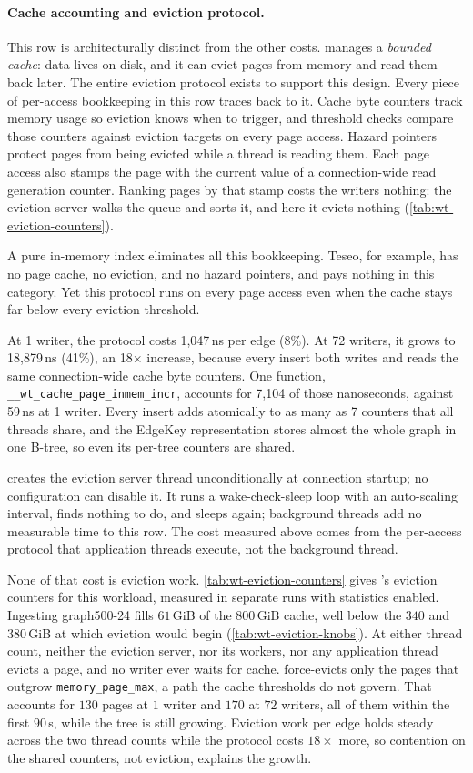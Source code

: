 \paragraph{Cache accounting and eviction protocol.}
This row is architecturally distinct from the other costs.
\wt{} manages a \emph{bounded cache}: data lives on disk, and it can evict pages from memory and read them back later.
The entire eviction protocol exists to support this design.
Every piece of per-access bookkeeping in this row traces back to it.
Cache byte counters track memory usage so eviction knows when to trigger, and threshold checks compare those counters against eviction targets on every page access.
Hazard pointers protect pages from being evicted while a thread is reading them.
Each page access also stamps the page with the current value of a connection-wide read generation counter.
Ranking pages by that stamp costs the writers nothing: the eviction server walks the queue and sorts it, and here it evicts nothing (\autoref{tab:wt-eviction-counters}).

A pure in-memory index eliminates all this bookkeeping.
Teseo, for example, has no page cache, no eviction, and no hazard pointers, and pays
nothing in this category.
Yet this protocol runs on every \wt{} page access even when the cache stays far below
every eviction threshold.

At 1 writer, the protocol costs 1,047\,ns per edge (8\%).
At 72 writers, it grows to 18,879\,ns (41\%), an 18$\times$ increase, because every insert
both writes and reads the same connection-wide cache byte counters.
One function, \texttt{\_\_wt\_cache\_page\_inmem\_incr}, accounts for 7,104 of those nanoseconds, against 59\,ns at 1 writer.
Every insert adds atomically to as many as 7 counters that all threads share, and the EdgeKey representation stores almost the whole graph in one B-tree, so even its per-tree counters are shared.

\wt{} creates the eviction server thread unconditionally at connection startup; no configuration can disable it.
It runs a wake-check-sleep loop with an auto-scaling interval, finds nothing to do, and sleeps again; background threads add no measurable time to this row.
The cost measured above comes from the per-access protocol that application threads execute, not the background thread.

None of that cost is eviction work.
\autoref{tab:wt-eviction-counters} gives \wt{}'s eviction counters for this workload, measured in separate runs with statistics enabled.
Ingesting graph500-24 fills $61$\,GiB of the $800$\,GiB cache, well below the $340$ and $380$\,GiB at which eviction would begin (\autoref{tab:wt-eviction-knobs}).
At either thread count, neither the eviction server, nor its workers, nor any application thread evicts a page, and no writer ever waits for cache.
\wt{} force-evicts only the pages that outgrow \texttt{memory\_page\_max}, a path the cache thresholds do not govern.
That accounts for $130$ pages at $1$ writer and $170$ at $72$ writers, all of them within the first $90$\,s, while the tree is still growing.
Eviction work per edge holds steady across the two thread counts while the protocol costs $18\times$ more, so contention on the shared counters, not eviction, explains the growth.

